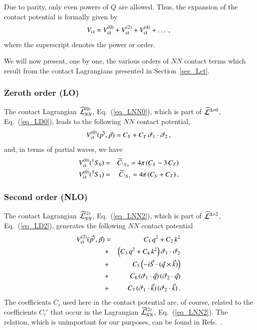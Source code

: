 \documentclass[sort&compress,preprint,3p]{elsarticle}
\def\be{\begin{eqnarray}}
\def\ee{\end{eqnarray}}
\begin{document}
Due to parity, only even powers of $Q$
are allowed.
Thus, the expansion of the contact potential is
formally given by
\begin{equation}
V_{\rm ct} =
V_{\rm ct}^{(0)} + 
V_{\rm ct}^{(2)} + 
V_{\rm ct}^{(4)} 
+ \ldots \; ,
\end{equation}
where the superscript denotes the power or order.

We will now present, one by one, the various orders of 
$NN$ contact terms which result from the contact
Lagrangians presented in Section~\ref{sec_Lct}.

\subsubsection{Zeroth order (LO)}

The contact Lagrangian
$\widehat{\cal L}^{(0)}_{NN}$,
Eq.~(\ref{eq_LNN0}), 
which is part of 
$\widehat{\cal L}^{\Delta=0}$,
Eq.~(\ref{eq_LD0}), 
leads to the following $NN$ contact potential,
\begin{equation}
V_{\rm ct}^{(0)}(\vec{p'},\vec{p}) =
C_S +
C_T \, \vec{\sigma}_1 \cdot \vec{\sigma}_2 \, ,
\label{eq_ct0}
\end{equation}
and, in terms of partial waves, we have
\be
V_{\rm ct}^{(0)}(^1 S_0)          &=&  \widetilde{C}_{^1 S_0} =
4\pi\, ( C_S - 3 \, C_T )
\nonumber \\
V_{\rm ct}^{(0)}(^3 S_1)          &=&  \widetilde{C}_{^3 S_1} =
4\pi\, ( C_S + C_T ) \,.
\label{eq_ct0_pw}
\ee

\subsubsection{Second order (NLO)}

The contact Lagrangian
$\widehat{\cal L}^{(2)}_{NN}$,
Eq.~(\ref{eq_LNN2}), 
which is part of 
$\widehat{\cal L}^{\Delta=2}$,
Eq.~(\ref{eq_LD2}), 
generates the following $NN$ contact potential
\be
V_{\rm ct}^{(2)}(\vec{p'},\vec{p}) &=&
C_1 \, q^2 +
C_2 \, k^2 
\nonumber 
\\ &+& 
\left(
C_3 \, q^2 +
C_4 \, k^2 
\right) \vec{\sigma}_1 \cdot \vec{\sigma}_2 
\nonumber 
\\
&+& C_5 \left( -i \vec{S} \cdot (\vec{q} \times \vec{k}) \right)
\nonumber 
\\ &+& 
 C_6 \, ( \vec{\sigma}_1 \cdot \vec{q} )\,( \vec{\sigma}_2 \cdot 
\vec{q} )
\nonumber 
\\ &+& 
 C_7 \, ( \vec{\sigma}_1 \cdot \vec{k} )\,( \vec{\sigma}_2 \cdot 
\vec{k} ) \,.
\label{eq_ct2}
\ee
The coefficients $C_i$ used here in the contact potential
are, of course, related to the coefficients $C_i'$
that occur in the Lagrangian
$\widehat{\cal L}^{(2)}_{NN}$,
Eq.~(\ref{eq_LNN2}).
The relation, which is unimportant for our purposes,
can be found in Refs.~\cite{ORK96,EGM98}.
\end{document}
